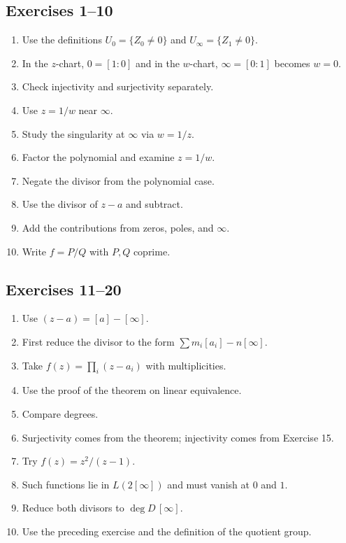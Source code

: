 \documentclass[11pt]{article}
\newcommand{\degd}{\operatorname{deg}}
\theoremstyle{plain}
\theoremstyle{definition}
\begin{document}
\subsection*{Exercises 1--10}
\begin{enumerate}[label=\textbf{\arabic*.}, start=1]
    \item Use the definitions $U_0=\{Z_0\neq 0\}$ and $U_{\infty}=\{Z_1\neq 0\}$.
    \item In the $z$-chart, $0=[1:0]$ and in the $w$-chart, $\infty=[0:1]$ becomes $w=0$.
    \item Check injectivity and surjectivity separately.
    \item Use $z=1/w$ near $\infty$.
    \item Study the singularity at $\infty$ via $w=1/z$.
    \item Factor the polynomial and examine $z=1/w$.
    \item Negate the divisor from the polynomial case.
    \item Use the divisor of $z-a$ and subtract.
    \item Add the contributions from zeros, poles, and $\infty$.
    \item Write $f=P/Q$ with $P,Q$ coprime.
\end{enumerate}

\subsection*{Exercises 11--20}
\begin{enumerate}[label=\textbf{\arabic*.}, start=11]
    \item Use $(z-a)=[a]-[\infty]$.
    \item First reduce the divisor to the form $\sum m_i[a_i]-n[\infty]$.
    \item Take $f(z)=\prod_i(z-a_i)$ with multiplicities.
    \item Use the proof of the theorem on linear equivalence.
    \item Compare degrees.
    \item Surjectivity comes from the theorem; injectivity comes from Exercise 15.
    \item Try $f(z)=z^2/(z-1)$.
    \item Such functions lie in $L(2[\infty])$ and must vanish at $0$ and $1$.
    \item Reduce both divisors to $\degd D\,[\infty]$.
    \item Use the preceding exercise and the definition of the quotient group.
\end{enumerate}
\end{document}
